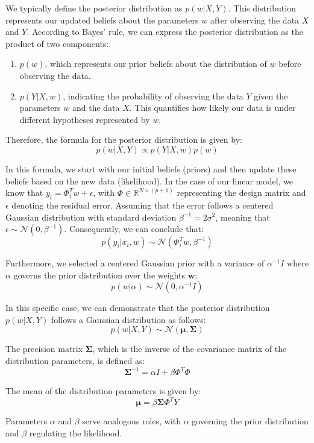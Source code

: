 We typically define the posterior distribution as $ p(w | X, Y) $. This distribution represents our updated beliefs about the parameters $ w $ after observing the data $ X $ and $ Y $. According to Bayes' rule, we can express the posterior distribution as the product of two components:
\begin{enumerate}
    \item $ p(w) $, which represents our prior beliefs about the distribution of $ w $ before observing the data.
    \item $ p(Y | X, w) $, indicating the probability of observing the data $ Y $ given the parameters $ w $ and the data $ X $. This quantifies how likely our data is under different hypotheses represented by $ w $.
\end{enumerate}
Therefore, the formula for the posterior distribution is given by:
\[ p(w | X, Y) \propto p(Y | X, w) p(w) \]

In this formula, we start with our initial beliefs (priors) and then update these beliefs based on the new data (likelihood). In the case of our linear model, we know that $ y_i = \Phi^T_i w + \epsilon $, with $ \Phi \in \mathbb{R}^{N \times (p + 1)} $ representing the design matrix and $ \epsilon $ denoting the residual error. Assuming that the error follows a centered Gaussian distribution with standard deviation $ \beta ^{-1} = 2\sigma^2 $, meaning that $ \epsilon \sim \mathcal{N}(0, \beta ^{-1}) $. Consequently, we can conclude that:
\[ p(y_i | x_i, w) \sim \mathcal{N}(\Phi^T_i w, \beta ^{-1}) \]

Furthermore, we selected a centered Gaussian prior with a variance of $ \alpha^{-1}I $ where $\alpha$ governs the prior distribution over the weights $\mathbf{w}$:
\[ p(w | \alpha) \sim \mathcal{N}(0, \alpha^{-1}I) \]

In this specific case, we can demonstrate that the posterior distribution $ p(w | X, Y) $ follows a Gaussian distribution as follows:
\[ p(w | X, Y) \sim \mathcal{N}(\boldsymbol{\mu}, \boldsymbol{\Sigma}) \]

The precision matrix $ \boldsymbol{\Sigma} $, which is the inverse of the covariance matrix of the distribution parameters, is defined as:
\[ \boldsymbol{\Sigma}^{-1} = \alpha I + \beta \Phi^T \Phi \]

\noindent The mean of the distribution parameters is given by:
\[ \boldsymbol{\mu} = \beta \boldsymbol{\Sigma} \Phi^T Y \]

Parameters $\alpha$ and $\beta$ serve analogous roles, with $\alpha$ governing the prior distribution and $\beta$ regulating the likelihood.

